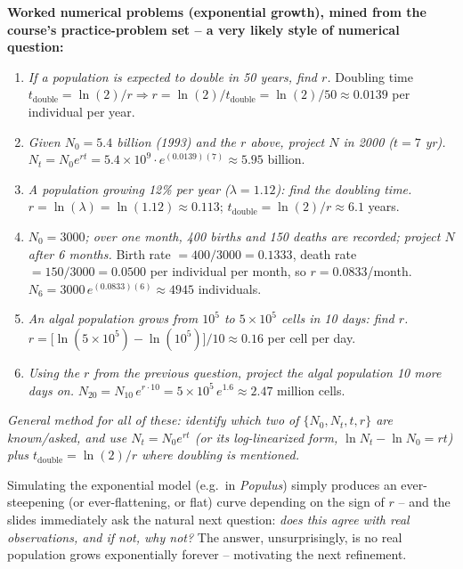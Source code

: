 \documentclass[11pt,a4paper]{article}
\begin{document}
\begin{exambox}
\textbf{Worked numerical problems (exponential growth), mined from the course's practice-problem set -- a very likely style of numerical question:}
\begin{enumerate}[leftmargin=1.3em,nosep]
\item \emph{If a population is expected to double in 50 years, find $r$.} Doubling time $t_{\text{double}} = \ln(2)/r \Rightarrow r = \ln(2)/t_{\text{double}} = \ln(2)/50 \approx 0.0139$ per individual per year.
\item \emph{Given $N_0 = 5.4$ billion (1993) and the $r$ above, project $N$ in 2000 ($t=7$ yr).} $N_t = N_0 e^{rt} = 5.4\times10^9 \cdot e^{(0.0139)(7)} \approx 5.95$ billion.
\item \emph{A population growing 12\% per year ($\lambda = 1.12$): find the doubling time.} $r = \ln(\lambda) = \ln(1.12) \approx 0.113$; $t_{\text{double}} = \ln(2)/r \approx 6.1$ years.
\item \emph{$N_0=3000$; over one month, 400 births and 150 deaths are recorded; project $N$ after 6 months.} Birth rate $=400/3000=0.1333$, death rate $=150/3000=0.0500$ per individual per month, so $r = 0.0833$/month. $N_6 = 3000\,e^{(0.0833)(6)} \approx 4945$ individuals.
\item \emph{An algal population grows from $10^5$ to $5\times10^5$ cells in 10 days: find $r$.} $r = \big[\ln(5\times10^5) - \ln(10^5)\big]/10 \approx 0.16$ per cell per day.
\item \emph{Using the $r$ from the previous question, project the algal population 10 more days on.} $N_{20} = N_{10}\,e^{r\cdot 10} = 5\times10^5\, e^{1.6} \approx 2.47$ million cells.
\end{enumerate}
\textit{General method for all of these: identify which two of $\{N_0, N_t, t, r\}$ are known/asked, and use $N_t = N_0 e^{rt}$ (or its log-linearized form, $\ln N_t - \ln N_0 = rt$) plus $t_{\text{double}} = \ln(2)/r$ where doubling is mentioned.}
\end{exambox}

Simulating the exponential model (e.g.\ in \emph{Populus}) simply produces an ever-steepening (or ever-flattening, or flat) curve depending on the sign of $r$ -- and the slides immediately ask the natural next question: \emph{does this agree with real observations, and if not, why not?} The answer, unsurprisingly, is no real population grows exponentially forever -- motivating the next refinement.
\end{document}
